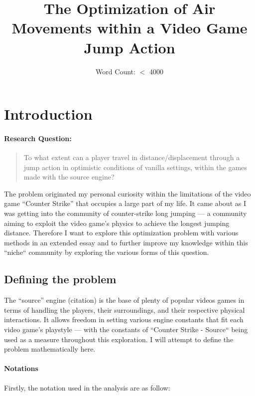 \documentclass[a4paper,12pt]{article}
\title{The Optimization of Air Movements within a Video Game Jump Action}
\author{Word Count: $<$ 4000}
\date{}
\begin{document}
    \maketitle

    \newpage

    \tableofcontents

    \newpage

\section{Introduction}

\paragraph{Research Question:}
\begin{quote}
    To what extent can a player travel in distance/displacement through a jump action in optimistic conditions of vanilla settings, within the games made with the source engine?
\end{quote}

The problem originated my personal curiosity within the limitations of the video game ``Counter Strike'' that occupies a large part of my life. It came about as I was getting into the community of counter-strike long jumping --- a community aiming to exploit the video game's physics to achieve the longest jumping distance. Therefore I want to explore this optimization problem with various methods in an extended essay and to further improve my knowledge within this ``niche`` community by exploring the various forms of this question.

\subsection{Defining the problem}
The ``source'' engine (citation) is the base of plenty of popular videos games in terms of handling the players, their surroundings, and their respective physical interactions. It allows freedom in setting various engine constants that fit each video game's playstyle --- with the constants of ``Counter Strike - Source`` being used as a measure throughout this exploration. I will attempt to define the problem mathematically here.

\paragraph{Notations} Firstly, the notation used in the analysis are as follow:
\end{document}
